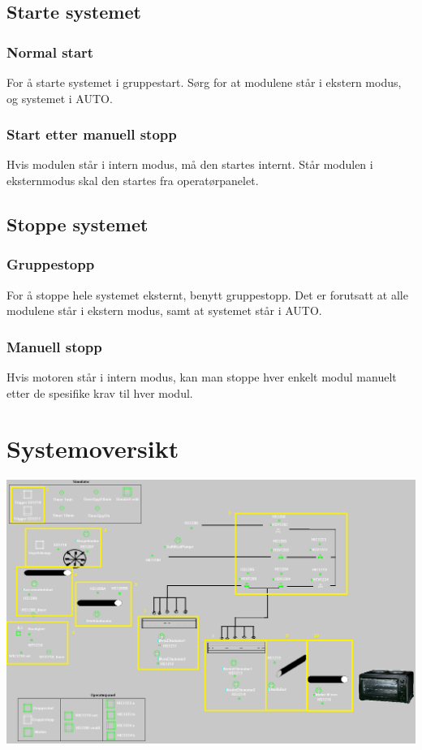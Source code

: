 \subsection{Starte systemet}
\subsubsection*{Normal start}
For å starte systemet i gruppestart. Sørg for at modulene står i ekstern modus, og systemet i AUTO. 
\subsubsection*{Start etter manuell stopp}
Hvis modulen står i intern modus, må den startes internt. Står modulen i eksternmodus skal den startes fra operatørpanelet. 

\subsection{Stoppe systemet}
\subsubsection*{Gruppestopp}
For å stoppe hele systemet eksternt, benytt gruppestopp. Det er forutsatt at alle modulene står i ekstern modus, samt at systemet står i AUTO. 
\subsubsection*{Manuell stopp}
Hvis motoren står i intern modus, kan man stoppe hver enkelt modul manuelt etter de spesifike krav til hver modul. 

\newpage

\section{Systemoversikt}

\includegraphics[width=\textwidth]{oversikt.png}

